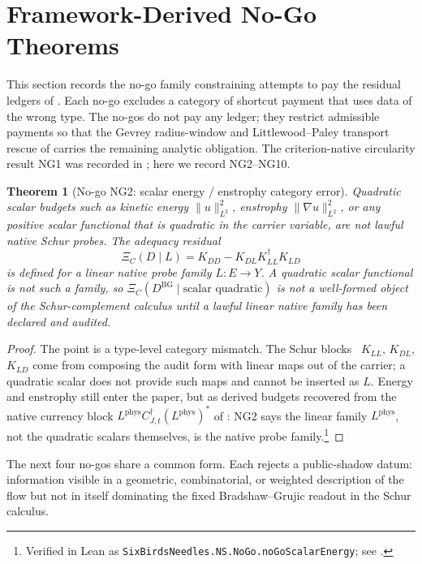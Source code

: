 \documentclass[11pt]{article}
\newcommand{\DBG}{D^{\mathrm{BG}}}
\newcommand{\Lphys}{L^{\mathrm{phys}}}
\newtheorem{theorem}{Theorem}[section]
\theoremstyle{definition}
\begin{document}
 

\section{Framework-Derived No-Go Theorems}
\label{sec:no-go}

This section records the no-go family constraining attempts to pay
the residual ledgers of .  Each no-go
excludes a category of shortcut payment that uses data of the wrong
type.  The no-gos do not pay any ledger; they restrict admissible
payments so that the Gevrey radius-window and Littlewood--Paley
transport rescue of  carries the remaining
analytic obligation.  The criterion-native circularity result NG1 was
recorded in ; here we record NG2--NG10.

\begin{theorem}[No-go NG2: scalar energy / enstrophy category error]
\label{thm:ns:no-go-scalar-energy}
Quadratic scalar budgets such as kinetic energy \(\|u\|_{L^2}^2\),
enstrophy \(\|\nabla u\|_{L^2}^2\), or any positive scalar functional
that is quadratic in the carrier variable, are not lawful native Schur
probes.  The adequacy residual
\[
  \Xi_C(D\mid L)=K_{DD}-K_{DL}K_{LL}^{\dagger}K_{LD}
\]
is defined for a linear native probe family \(L:E\to Y\).  A quadratic
scalar functional is not such a family, so
\(\Xi_C(\DBG\mid\text{scalar quadratic})\) is not a well-formed object
of the Schur-complement calculus until a lawful linear native family has
been declared and audited.
\end{theorem}

\begin{proof}
The point is a type-level category mismatch.  The Schur
blocks~\citep{HornJohnson2013MatrixAnalysis} \(K_{LL}\), \(K_{DL}\),
\(K_{LD}\) come from composing the audit form with linear maps out of
the carrier; a quadratic scalar does not provide such maps and cannot
be inserted as \(L\).  Energy and
enstrophy still enter the paper, but as derived budgets recovered from
the native currency block \(\Lphys C_{J,t}^{\dagger}(\Lphys)^*\) of
: NG2 says the linear family \(\Lphys\), not the
quadratic scalars themselves, is the native probe family.\footnote{Verified in Lean as \texttt{SixBirdsNeedles.NS.NoGo.noGoScalarEnergy}; see .}
\end{proof}

The next four no-gos share a common form.  Each rejects a
public-shadow datum: information visible in a geometric, combinatorial,
or weighted description of the flow but not in itself dominating the
fixed Bradshaw--Grujic readout in the Schur calculus.
\end{document}
